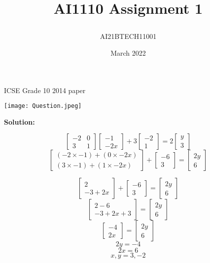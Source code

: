 \documentclass[11pt]{article}
\title{\textbf{AI1110 Assignment 1}
\author{AI21BTECH11001 }}
\date{March 2022}
\begin{document}
\maketitle
\begin{center}
{ICSE Grade 10 2014 paper}\end{center}

\texttt{[image: Question.jpeg]}

\textbf{Solution:}

$$ 
\left [\begin{array}{cc} -2 & 0 \\
 3 & 1\end{array}\right ]\left[\begin{array}{cc}-1 \\
 -2x\end{array}\right]+3\left[\begin{array}{cc}-2 \\
 1\end{array}\right] = 2\left[\begin{array}{cc}y \\
 3\end{array}\right]
$$
$$
\left[\begin{array}{cc}(-2\times-1) + (0\times-2x) \\
 (3\times-1) + (1\times-2x)\end{array}\right] + \left[\begin{array}{cc}-6 \\
 3\end{array}\right] = \left[\begin{array}{cc}2y \\
 6\end{array}\right]
$$

$$
\left[\begin{array}{cc}2 \\
 -3+2x\end{array}\right]+\left[\begin{array}{cc}-6 \\
 3\end{array}\right] = \left[\begin{array}{cc}2y \\
 6\end{array}\right]
$$
$$
\left[\begin{array}{cc}2-6 \\
 -3+2x+3\end{array}\right] = \left[\begin{array}{cc}2y \\
 6\end{array}\right]
$$
$$
\left[\begin{array}{cc}-4 \\
 2x\end{array}\right] = \left[\begin{array}{cc}2y \\
 6\end{array}\right]
$$
$$2y = -4$$
$$2x = 6 $$
$$x,y = 3,-2 $$
\end{document}
